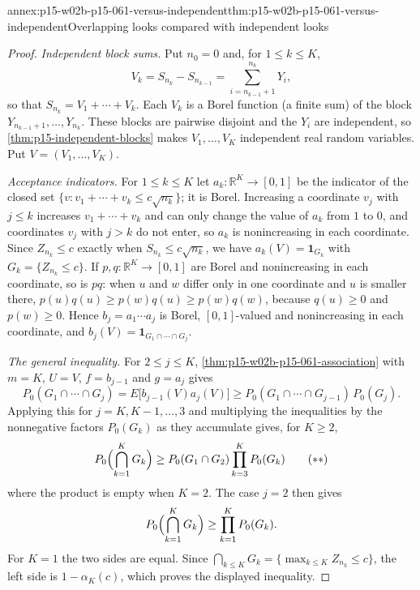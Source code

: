 \begin{annexitem}{annex:p15-w02b-p15-061-versus-independent}{thm:p15-w02b-p15-061-versus-independent}{Overlapping looks compared with independent looks}
\begin{proof}
\emph{Independent block sums.} Put \(n_0=0\) and, for \(1\leq k\leq K\),
\[
 V_k=S_{n_k}-S_{n_{k-1}}=\sum_{i=n_{k-1}+1}^{n_k}Y_i ,
\]
so that \(S_{n_k}=V_1+\cdots+V_k\). Each \(V_k\) is a Borel function (a
finite sum) of the block \(Y_{n_{k-1}+1},\ldots,Y_{n_k}\). These blocks
are pairwise disjoint and the \(Y_i\) are independent, so
\cref{thm:p15-independent-blocks} makes \(V_1,\ldots,V_K\) independent
real random variables. Put \(V=(V_1,\ldots,V_K)\).

\emph{Acceptance indicators.} For \(1\leq k\leq K\) let
\(a_k\colon\mathbb R^K\to[0,1]\) be the indicator of the closed set
\(\{v:v_1+\cdots+v_k\leq c\sqrt{n_k}\}\); it is Borel. Increasing a
coordinate \(v_j\) with \(j\leq k\) increases \(v_1+\cdots+v_k\) and can
only change the value of \(a_k\) from \(1\) to \(0\), and coordinates
\(v_j\) with \(j>k\) do not enter, so \(a_k\) is nonincreasing in each
coordinate. Since \(Z_{n_k}\leq c\) exactly when
\(S_{n_k}\leq c\sqrt{n_k}\), we have \(a_k(V)=\mathbf 1_{G_k}\) with
\(G_k=\{Z_{n_k}\leq c\}\).
If \(p,q\colon\mathbb R^K\to[0,1]\) are Borel and nonincreasing in each
coordinate, so is \(pq\): when \(u\) and \(w\) differ only in one
coordinate and \(u\) is smaller there,
\(p(u)q(u)\geq p(w)q(u)\geq p(w)q(w)\), because \(q(u)\geq0\) and
\(p(w)\geq0\). Hence \(b_j=a_1\cdots a_j\) is Borel, \([0,1]\)-valued and
nonincreasing in each coordinate, and
\(b_j(V)=\mathbf 1_{G_1\cap\cdots\cap G_j}\).

\emph{The general inequality.} For \(2\leq j\leq K\),
\cref{thm:p15-w02b-p15-061-association} with \(m=K\), \(U=V\),
\(f=b_{j-1}\) and \(g=a_j\) gives
\[
 P_0(G_1\cap\cdots\cap G_j)=E\bigl[b_{j-1}(V)a_j(V)\bigr]
 \geq P_0(G_1\cap\cdots\cap G_{j-1})\,P_0(G_j).
\]
Applying this for \(j=K,K-1,\ldots,3\) and multiplying the inequalities
by the nonnegative factors \(P_0(G_k)\) as they accumulate gives, for
\(K\geq2\),
\[
 P_0\Bigl(\bigcap_{k=1}^KG_k\Bigr)\geq
 P_0(G_1\cap G_2)\prod_{k=3}^KP_0(G_k)
 \tag{\(\ast\ast\)}
\]
where the product is empty when \(K=2\). The case \(j=2\) then gives
\[
 P_0\Bigl(\bigcap_{k=1}^KG_k\Bigr)\geq\prod_{k=1}^KP_0(G_k).
\]
For \(K=1\) the two sides are equal. Since
\(\bigcap_{k\leq K}G_k=\{\max_{k\leq K}Z_{n_k}\leq c\}\), the left side
is \(1-\alpha_K(c)\), which proves the displayed inequality.


\end{proof}
\end{annexitem}
